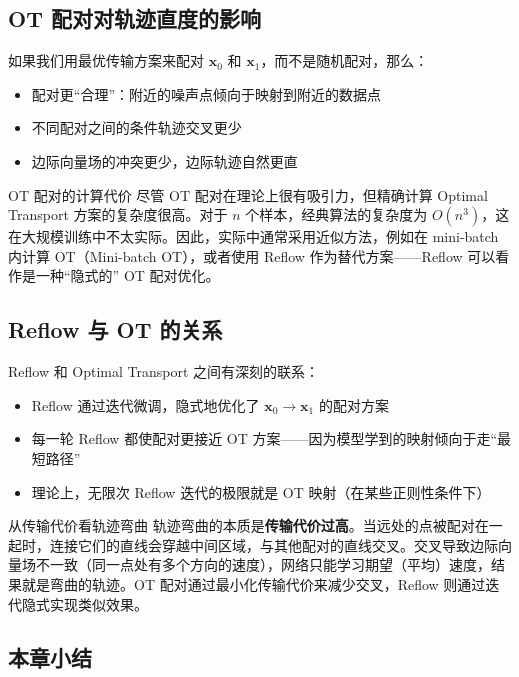 \documentclass[a4paper]{article}
\begin{document}
\subsection{OT 配对对轨迹直度的影响}

如果我们用最优传输方案来配对 $\mathbf{x}_0$ 和 $\mathbf{x}_1$，而不是随机配对，那么：

\begin{itemize}
    \item 配对更``合理''：附近的噪声点倾向于映射到附近的数据点
    \item 不同配对之间的条件轨迹交叉更少
    \item 边际向量场的冲突更少，边际轨迹自然更直
\end{itemize}

\begin{warningbox}{OT 配对的计算代价}
尽管 OT 配对在理论上很有吸引力，但精确计算 Optimal Transport 方案的复杂度很高。对于 $n$ 个样本，经典算法的复杂度为 $O(n^3)$，这在大规模训练中不太实际。因此，实际中通常采用近似方法，例如在 mini-batch 内计算 OT（Mini-batch OT），或者使用 Reflow 作为替代方案——Reflow 可以看作是一种``隐式的'' OT 配对优化。
\end{warningbox}

\subsection{Reflow 与 OT 的关系}

Reflow 和 Optimal Transport 之间有深刻的联系：

\begin{itemize}
    \item Reflow 通过迭代微调，隐式地优化了 $\mathbf{x}_0 \to \mathbf{x}_1$ 的配对方案
    \item 每一轮 Reflow 都使配对更接近 OT 方案——因为模型学到的映射倾向于走``最短路径''
    \item 理论上，无限次 Reflow 迭代的极限就是 OT 映射（在某些正则性条件下）
\end{itemize}

\begin{knowledgebox}{从传输代价看轨迹弯曲}
轨迹弯曲的本质是\textbf{传输代价过高}。当远处的点被配对在一起时，连接它们的直线会穿越中间区域，与其他配对的直线交叉。交叉导致边际向量场不一致（同一点处有多个方向的速度），网络只能学习期望（平均）速度，结果就是弯曲的轨迹。OT 配对通过最小化传输代价来减少交叉，Reflow 则通过迭代隐式实现类似效果。
\end{knowledgebox}

\subsection{本章小结}
\end{document}
